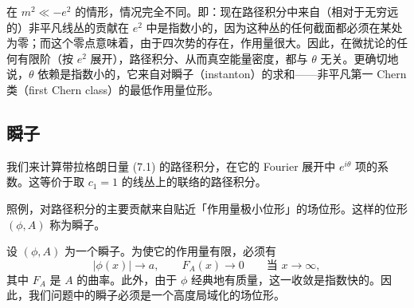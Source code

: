 在 $m^2\ll-e^2$ 的情形，情况完全不同。即：现在路径积分中来自（相对于无穷远的）非平凡线丛的贡献在 $e^2$ 中是指数小的，因为这种丛的任何截面都必须在某处为零；而这个零点意味着，由于四次势的存在，作用量很大。因此，在微扰论的任何有限阶（按 $e^2$ 展开），路径积分、从而真空能量密度，都与 $\theta$ 无关。更确切地说，$\theta$ 依赖是指数小的，它来自对瞬子（instanton）的求和——非平凡第一 Chern 类（first Chern class）的最低作用量位形。



\subsection{瞬子}

我们来计算带拉格朗日量 (7.1) 的路径积分，在它的 Fourier 展开中 $e^{i\theta}$ 项的系数。这等价于取 $c_1=1$ 的线丛上的联络的路径积分。

照例，对路径积分的主要贡献来自贴近「作用量极小位形」的场位形。这样的位形 $(\phi,A)$ 称为瞬子。

设 $(\phi,A)$ 为一个瞬子。为使它的作用量有限，必须有
\begin{equation}
  \tag{7.3}
  \label{eq:7-3}
  |\phi(x)|\to a,\qquad F_A(x)\to 0\qquad\text{当 }x\to\infty,
\end{equation}
其中 $F_A$ 是 $A$ 的曲率。此外，由于 $\phi$ 经典地有质量，这一收敛是指数快的。因此，我们问题中的瞬子必须是一个高度局域化的场位形。

